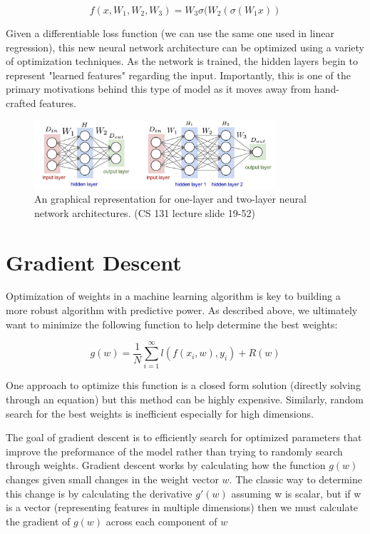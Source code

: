 \documentclass{article}
\begin{document}
$$f(x,W_1,W_2,W_3) = W_3\sigma(W_2(\sigma(W_1x))$$ 

Given a differentiable loss function (we can use the same one used in linear regression), this new neural network architecture can be optimized using a variety of optimization techniques. As the network is trained, the hidden layers begin to represent "learned features" regarding the input. Importantly, this is one of the primary motivations behind this type of model as it moves away from hand-crafted features.

\begin{figure}[h]
\includegraphics[width=9cm]{neural_network.png}
\centering
\caption{An graphical representation for one-layer and two-layer neural network architectures. (CS 131 lecture slide 19-52)}
\end{figure}

\section{Gradient Descent}
Optimization of weights in a machine learning algorithm is key to building a more robust algorithm with predictive power. As described above, we ultimately want to minimize the following function to help determine the best weights:

$$ g(w) = \frac{1}{N} \sum_{i=1}^{\infty} l(f(x_i, w), y_i) + R(w)$$

One approach to optimize this function is a closed form solution (directly solving through an equation) but this method can be highly expensive. Similarly, random search for the best weights is inefficient especially for high dimensions.

The goal of gradient descent is to efficiently search for optimized parameters that improve the preformance of the model rather than trying to randomly search through weights. Gradient descent works by calculating how the function $g(w)$ changes given small changes in the weight vector $w$. The classic way to determine this change is by calculating the derivative $g'(w)$ assuming w is scalar, but if w is a vector (representing features in multiple dimensions) then we must calculate the gradient of $g(w)$ across each component of $w$
\end{document}
